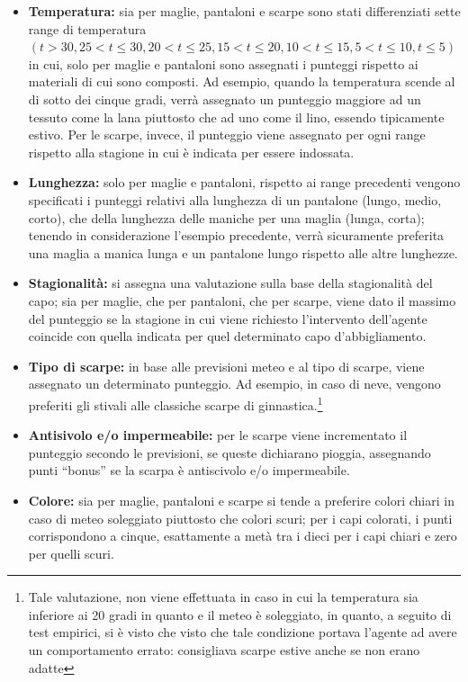 \documentclass[a4paper, 11pt, oneside]{report}
\begin{document}
            \begin{itemize}
                \item \textbf{Temperatura:} sia per maglie, pantaloni e scarpe sono stati differenziati sette range di temperatura
                $(t>30, 25<t\leq 30, 20<t\leq 25, 15<t\leq 20, 10<t\leq 15, 5<t\leq 10, t\leq 5)$ in cui,
                solo per maglie e pantaloni sono assegnati i punteggi rispetto ai materiali di cui sono composti.
                Ad esempio, quando la temperatura scende al di sotto dei cinque gradi, verrà assegnato un punteggio maggiore ad un tessuto
                come la lana piuttosto che ad uno come il lino, essendo tipicamente estivo.
                Per le scarpe, invece, il punteggio viene assegnato per ogni range rispetto alla stagione in cui è indicata per essere
                indossata.
                \item \textbf{Lunghezza:} solo per maglie e pantaloni, rispetto ai range precedenti vengono specificati i punteggi relativi
                alla lunghezza di un pantalone (lungo, medio, corto), che della lunghezza delle maniche per una maglia (lunga, corta);
                tenendo in considerazione l'esempio precedente, verrà sicuramente preferita una maglia a manica lunga e un pantalone
                lungo rispetto alle altre lunghezze.
                \item \textbf{Stagionalità:} si assegna una valutazione sulla base della stagionalità del capo; sia per maglie, che per
                pantaloni, che per scarpe, viene dato il massimo del punteggio se la stagione in cui viene richiesto l'intervento dell'agente coincide
                con quella indicata per quel determinato capo d'abbigliamento.
                \item \textbf{Tipo di scarpe:} in base alle previsioni meteo e al tipo di scarpe, viene assegnato un determinato punteggio.
                Ad esempio, in caso di neve, vengono preferiti gli stivali alle classiche scarpe di ginnastica.\footnote{Tale valutazione,
                    non viene effettuata in caso in cui la temperatura sia inferiore ai 20 gradi in quanto e il meteo è soleggiato,
                    in quanto, a seguito di test empirici, si è visto che visto che tale condizione portava l'agente ad avere un comportamento errato: consigliava scarpe estive anche se non erano adatte}
                \item \textbf{Antisivolo e/o impermeabile:} per le scarpe viene incrementato il
                punteggio secondo le previsioni, se queste dichiarano pioggia, assegnando punti ``bonus'' se la
                scarpa è antiscivolo e/o impermeabile.
                \item \textbf{Colore:} sia per maglie, pantaloni e scarpe si tende a preferire colori chiari in caso di meteo
                soleggiato piuttosto che colori scuri; per i capi colorati, i punti corrispondono a cinque, esattamente a
                metà tra i dieci per i capi chiari e zero per quelli scuri.
            \end{itemize}
\end{document}
